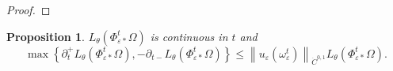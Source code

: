 \documentclass[reqno,centertags,12pt]{amsart}
\newtheorem{proposition}[theorem]{Proposition}
\theoremstyle{definition}
\numberwithin{equation}{section}
\newcommand{\abs}[1]{\left\lvert#1\right\rvert}
\newcommand{\norm}[1]{\left\|#1\right\|}
\newcommand{\set}[1]{\left\{ #1 \right\}}
\newcommand{\eps}{\varepsilon}
\newcommand{\tht}{\theta}
\begin{document}
\begin{proof}
\end{proof}

\begin{proposition}\label{P2.6}
    $L_{\tht}(\Phi_{\eps*}^{t}\Omega)$ is continuous in $t$ and
    \[
        \max\set{
            \partial_{t}^{+}L_{\tht}(\Phi_{\eps*}^{t}\Omega),
            -\partial_{t-}L_{\tht}(\Phi_{\eps*}^{t}\Omega)
        }
        \leq \norm{u_{\eps}(\omega_{\eps}^{t})}_{\dot{C}^{0,1}}
        L_{\tht}(\Phi_{\eps*}^{t}\Omega).
    \]
\end{proposition}
\end{document}
